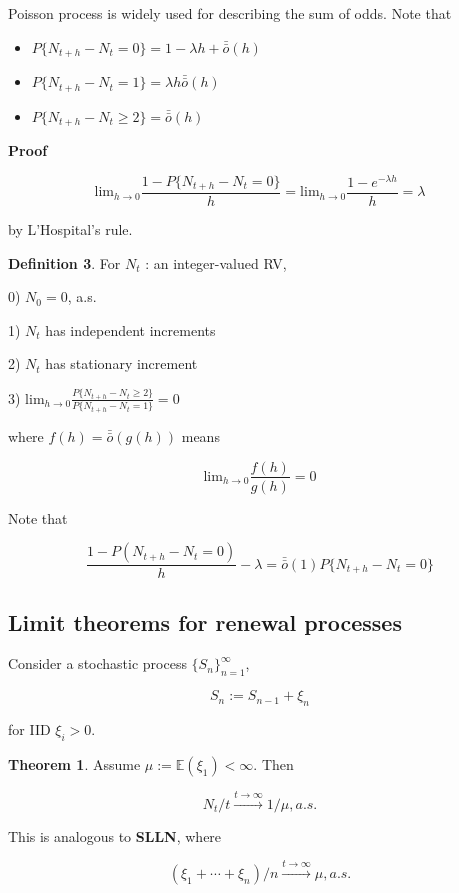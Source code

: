 \documentclass[12pt]{article}
\theoremstyle{nonumberbreak}
\begin{document}
Poisson process is widely used for describing the sum of odds. Note that


\begin{theorem}
\begin{itemize}
	\item $P\{ N_{t+h} - N_t = 0 \} = 1 - \lambda h + \bar{\bar{o}}(h)$
	\item $P\{ N_{t+h} - N_t = 1 \} = \lambda h \bar{\bar{o}}(h)$
	\item $P\{ N_{t+h} - N_t \ge 2 \} = \bar{\bar{o}}(h)$
\end{itemize}
\end{theorem}

\textbf{Proof} 

$$
\mathrm{lim}_{h \to 0} \frac{1 - P\{ N_{t+h} - N_t = 0 \}}{h} = \mathrm{lim}_{h \to 0} \frac{1-e^{-\lambda h}}{h} = \lambda
$$

by L'Hospital's rule.


\begin{theorem}
\textbf{Definition 3}. For $N_t$ : an integer-valued RV,
	\item 0) $N_0 = 0$, a.s.
	\item 1) $N_t$ has independent increments
	\item 2) $N_t$ has stationary increment 
	\item 3) $\mathrm{lim}_{h \to 0} \frac{P\{ N_{t+h} - N_t \ge 2 \}}{P\{ N_{t+h} - N_t = 1 \}} = 0 $
\end{theorem}


where $f(h) = \bar{\bar{o}} (g(h))$ means

$$
\mathrm{lim}_{h\to0} \frac{f(h)}{g(h)} = 0
$$ 

Note that 

$$
\frac{1 - P(N_{t+h} - N_t = 0) }{h} - \lambda = \bar{\bar{o}} (1) P\{ N_{t+h} - N_t = 0 \}
$$




\subsection{Limit theorems for renewal processes}


Consider a stochastic process $\{S_n \}_{n=1}^\infty$,

$$
S_n := S_{n-1} + \xi_n
$$

for IID $\xi_i > 0$. 

\begin{theorem}
\textbf{Theorem 1}. Assume $\mu := \mathbb{E} (\xi_1) < \infty$. Then 

$$
N_t / t \overset{t \to \infty}{\to} 1/\mu, a.s.
$$

This is analogous to \textbf{SLLN}, where 

$$
(\xi_1 + \cdots + \xi_n) / n \overset{t \to \infty}{\to}  \mu, a.s.
$$
\end{theorem}
\end{document}
